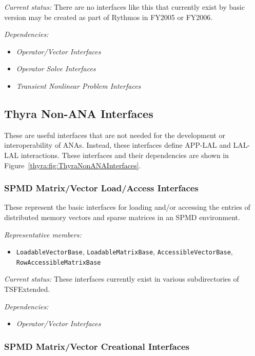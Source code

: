 \documentclass[pdf,ps2pdf,11pt]{SANDreport}
\begin{document}
{}\textit{Current status:} There are no interfaces like this that currently
exist by basic version may be created as part of Rythmos in FY2005 or FY2006.

{}\textit{Dependencies:}
\begin{itemize}
\item {}\textit{Operator/Vector Interfaces}
\item {}\textit{Operator Solve Interfaces}
\item {}\textit{Transient Nonlinear Problem Interfaces}
\end{itemize}

%
\subsection{Thyra Non-ANA Interfaces}
%

These are useful interfaces that are not needed for the development or
interoperability of ANAs.  Instead, these interfaces define APP-LAL and
LAL-LAL interactions.  These interfaces and their dependencies are shown in
Figure~\ref{thyra:fig:ThyraNonANAInterfaces}.

%
\subsubsection{SPMD Matrix/Vector Load/Access Interfaces}
%

These represent the basic interfaces for loading and/or accessing the entries
of distributed memory vectors and sparse matrices in an SPMD environment.

{}\textit{Representative members:}
\begin{itemize}
%
{}\item {}\texttt{LoadableVectorBase}, {}\texttt{LoadableMatrixBase},
{}\texttt{AccessibleVectorBase}, {}\texttt{RowAccessibleMatrixBase}
%
\end{itemize}

{}\textit{Current status:} These interfaces currently exist in various
subdirectories of TSFExtended.

{}\textit{Dependencies:}
\begin{itemize}
\item {}\textit{Operator/Vector Interfaces}
\end{itemize}

%
\subsubsection{SPMD Matrix/Vector Creational Interfaces}
%
\end{document}
